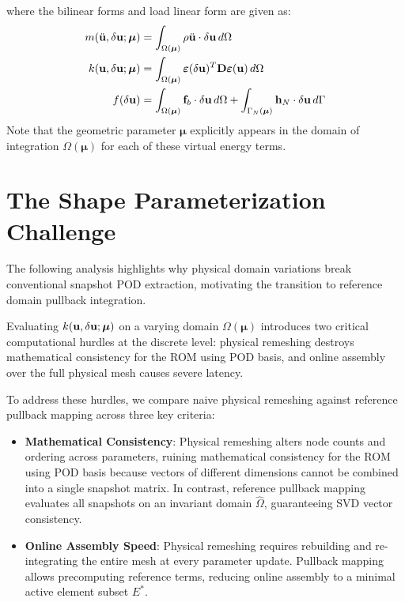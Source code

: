 where the bilinear forms and load linear form are given as:
\begin{align}
    m(\ddot{\mathbf{u}}, \delta\mathbf{u}; \boldsymbol{\mu}) & = \int_{\Omega(\boldsymbol{\mu})} \rho \ddot{\mathbf{u}} \cdot \delta\mathbf{u} \, d\Omega                                                                      \\
    k(\mathbf{u}, \delta\mathbf{u}; \boldsymbol{\mu})        & = \int_{\Omega(\boldsymbol{\mu})} \boldsymbol{\varepsilon}(\delta\mathbf{u})^T \mathbf{D} \boldsymbol{\varepsilon}(\mathbf{u}) \, d\Omega                          \\
    f(\delta\mathbf{u})                                    & = \int_{\Omega(\boldsymbol{\mu})} \mathbf{f}_b \cdot \delta\mathbf{u} \, d\Omega + \int_{\Gamma_N(\boldsymbol{\mu})} \mathbf{h}_N \cdot \delta\mathbf{u} \, d\Gamma
\end{align}
Note that the geometric parameter $\boldsymbol{\mu}$ explicitly appears in the domain of integration $\Omega(\boldsymbol{\mu})$ for each of these virtual energy terms.

\section{The Shape Parameterization Challenge}

The following analysis highlights why physical domain variations break conventional snapshot POD extraction, motivating the transition to reference domain pullback integration.

Evaluating $k(\mathbf{u}, \delta\mathbf{u}; \boldsymbol{\mu})$ on a varying domain $\Omega(\boldsymbol{\mu})$ introduces two critical computational hurdles at the discrete level: physical remeshing destroys mathematical consistency for the ROM using POD basis, and online assembly over the full physical mesh causes severe latency.

To address these hurdles, we compare naive physical remeshing against reference pullback mapping across three key criteria:

\begin{itemize}[leftmargin=*]
    \item \textbf{Mathematical Consistency}: Physical remeshing alters node counts and ordering across parameters, ruining mathematical consistency for the ROM using POD basis because vectors of different dimensions cannot be combined into a single snapshot matrix. In contrast, reference pullback mapping evaluates all snapshots on an invariant domain $\hat{\Omega}$, guaranteeing SVD vector consistency.
    \item \textbf{Online Assembly Speed}: Physical remeshing requires rebuilding and re-integrating the entire mesh at every parameter update. Pullback mapping allows precomputing reference terms, reducing online assembly to a minimal active element subset $E^*$.
\end{itemize}

